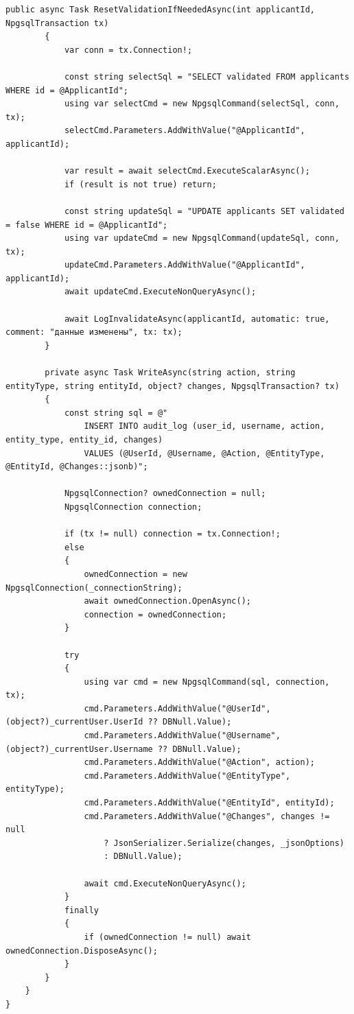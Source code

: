 \begin{lstlisting}[style=csharpstyle]
        public async Task ResetValidationIfNeededAsync(int applicantId, NpgsqlTransaction tx)
        {
            var conn = tx.Connection!;

            const string selectSql = "SELECT validated FROM applicants WHERE id = @ApplicantId";
            using var selectCmd = new NpgsqlCommand(selectSql, conn, tx);
            selectCmd.Parameters.AddWithValue("@ApplicantId", applicantId);

            var result = await selectCmd.ExecuteScalarAsync();
            if (result is not true) return;

            const string updateSql = "UPDATE applicants SET validated = false WHERE id = @ApplicantId";
            using var updateCmd = new NpgsqlCommand(updateSql, conn, tx);
            updateCmd.Parameters.AddWithValue("@ApplicantId", applicantId);
            await updateCmd.ExecuteNonQueryAsync();

            await LogInvalidateAsync(applicantId, automatic: true, comment: "данные изменены", tx: tx);
        }

        private async Task WriteAsync(string action, string entityType, string entityId, object? changes, NpgsqlTransaction? tx)
        {
            const string sql = @"
                INSERT INTO audit_log (user_id, username, action, entity_type, entity_id, changes)
                VALUES (@UserId, @Username, @Action, @EntityType, @EntityId, @Changes::jsonb)";

            NpgsqlConnection? ownedConnection = null;
            NpgsqlConnection connection;

            if (tx != null) connection = tx.Connection!;
            else
            {
                ownedConnection = new NpgsqlConnection(_connectionString);
                await ownedConnection.OpenAsync();
                connection = ownedConnection;
            }

            try
            {
                using var cmd = new NpgsqlCommand(sql, connection, tx);
                cmd.Parameters.AddWithValue("@UserId", (object?)_currentUser.UserId ?? DBNull.Value);
                cmd.Parameters.AddWithValue("@Username", (object?)_currentUser.Username ?? DBNull.Value);
                cmd.Parameters.AddWithValue("@Action", action);
                cmd.Parameters.AddWithValue("@EntityType", entityType);
                cmd.Parameters.AddWithValue("@EntityId", entityId);
                cmd.Parameters.AddWithValue("@Changes", changes != null
                    ? JsonSerializer.Serialize(changes, _jsonOptions)
                    : DBNull.Value);

                await cmd.ExecuteNonQueryAsync();
            }
            finally
            {
                if (ownedConnection != null) await ownedConnection.DisposeAsync();
            }
        }
    }
}
\end{lstlisting}

